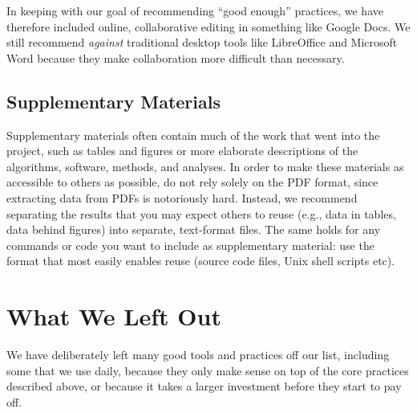 \documentclass[10pt,letterpaper]{article}
\newcommand{\practicesection}[2]{\section{#1}\label{#2}}
\begin{document}
In keeping with our goal of recommending ``good enough'' practices, we
have therefore included online, collaborative editing in something like Google
Docs. We still recommend \emph{against} traditional desktop tools like
LibreOffice and Microsoft Word because they make collaboration more
difficult than necessary.

\subsection*{Supplementary Materials}

Supplementary materials often contain much of the work that went into
the project, such as tables and figures or more elaborate descriptions
of the algorithms, software, methods, and analyses. In order to make
these materials as accessible to others as possible, do not rely
solely on the PDF format, since extracting data from PDFs is
notoriously hard.  Instead, we recommend separating the results that
you may expect others to reuse (e.g., data in tables, data behind
figures) into separate, text-format files. The same holds for any
commands or code you want to include as supplementary material: use
the format that most easily enables reuse (source code files, Unix
shell scripts etc).

\practicesection{What We Left Out}{sec:omitted}

We have deliberately left many good tools and practices off our list,
including some that we use daily, because they only make sense on top
of the core practices described above, or because it takes a larger
investment before they start to pay off.
\end{document}

